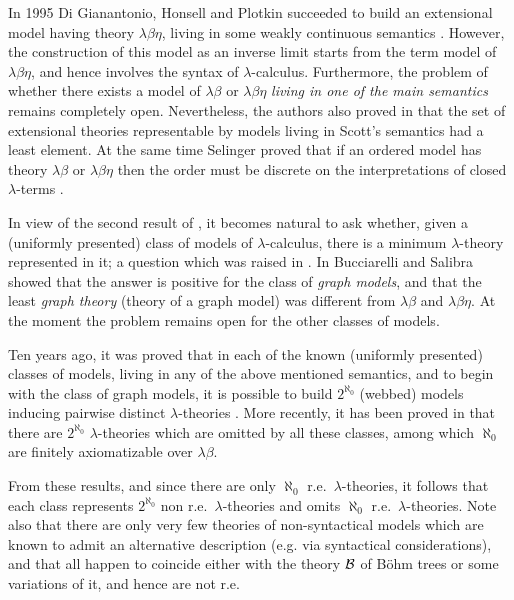 \documentclass[english]{llncs}
\newcommand{\gl}{\lambda}
\begin{document}
In 1995 Di Gianantonio, Honsell and Plotkin succeeded to build an extensional model having theory $\lambda\beta\eta$, living in some 
weakly continuous semantics \cite{DiGianantonioHP95}. 
However, the construction of this model as an inverse limit starts from the term model of $\lambda\beta\eta$, and hence involves the 
syntax of $\lambda$-calculus. 
Furthermore, the problem of whether there exists a model of $\lambda\beta$ or $\lambda\beta\eta$ {\em living in one of the main semantics} 
remains completely open. 
Nevertheless, the authors also proved in \cite{DiGianantonioHP95} that the set of extensional theories representable by models living in
Scott's semantics had a least element. 
At the same time Selinger proved that if an ordered model has theory $\lambda\beta$ or $\lambda\beta\eta$ then the order must be discrete on the interpretations of closed $\lambda$-terms \cite{Selinger03}.

In view of the second result of \cite{DiGianantonioHP95}, it becomes natural to ask whether, given a (uniformly presented) class of models of $\lambda$-calculus, 
there is a minimum $\lambda$-theory represented in it; a question which was raised in \cite{Berline00}. 
In \cite{BucciarelliS04,BucciarelliS0X} Bucciarelli and Salibra showed that the answer is positive for the class of \emph{graph models}, and that 
the least \emph{graph theory} (theory of a graph model) was different from $\lambda\beta$ and $\lambda\beta\eta$.
At the moment the problem remains open for the other classes of models.

Ten years ago, it was proved that in each of the known (uniformly presented) classes of models, living in any of the above mentioned semantics, 
and to begin with the class of graph models, it is possible to build $2^{\aleph_{0}}$ (webbed) models inducing pairwise distinct $\lambda$-theories 
\cite{Kerth98b,Kerth01}. 
More recently, it has been proved in \cite{Salibra03} that there are $2^{\aleph_{0}}$ $\gl$-theories which are omitted by all these classes, among which 
$\aleph_{0}$ are finitely axiomatizable over $\lambda\beta$.

From these results, and since there are only $\aleph_{0}$ r.e.\ $\gl$-theories, it follows that each class represents $2^{\aleph_{0}}$ non r.e.\ 
$\gl$-theories and omits $\aleph_{0}$ r.e.\ $\gl$-theories. 
Note also that there are only very few theories of non-syntactical models which are known to admit an alternative description 
(e.g. via syntactical considerations), and that all happen to coincide either with the theory $\mathcal{B}$ of B\"{o}hm trees \cite[Sec.~16.4]{Bare} 
or some variations of it, and hence are not r.e. 
\end{document}

